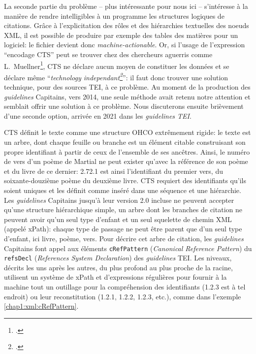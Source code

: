 La seconde partie du problème -- plus intéressante pour nous ici -- s'intéresse à la manière de rendre intelligibles à un programme les structures logiques de citations. Grâce à l'explicitation des rôles et des hiérarchies textuelles des noeuds XML, il est possible de produire par exemple des tables des matières pour un logiciel: le fichier devient donc \textit{machine-actionable}. Or, si l'usage de l'expression \enquote{encodage CTS} peut se trouver chez des chercheurs aguerris comme  L.~Muellner\footcite{muellner2019free}, CTS ne déclare aucun moyen de constituer les données et se déclare même \enquote{\textit{technology independant\footcite{smith_brief_nodate}}}: il faut donc trouver une solution technique, pour des sources TEI, à ce problème. Au moment de la production des \textit{guidelines} Capitains, vers 2014, une seule méthode avait retenu notre attention et semblait offrir une solution à ce problème. Nous discuterons ensuite brièvement d'une seconde option, arrivée en 2021 dans les \textit{guidelines TEI}.

CTS définit le texte comme une structure OHCO extrêmement rigide: le texte est un arbre, dont chaque feuille ou branche est un élément citable construisant son propre identifiant à partir de ceux de l'ensemble de ses ancêtres. Ainsi, le numéro de vers d'un poème de Martial ne peut exister qu'avec la référence de son poème et du livre de ce dernier: 2.72.1 est ainsi l'identifiant du premier vers, du soixante-douzième poème du deuxième livre. CTS requiert des identifiants qu'ils soient uniques et les définit comme inséré dans une séquence et une hiérarchie. Les \textit{guidelines} Capitains jusqu'à leur version 2.0 incluse ne peuvent accepter qu'une structure hiérarchique simple, un arbre dont les branches de citation ne peuvent avoir qu'un seul type d'enfant et un seul squelette de chemin XML (appelé xPath): chaque type de passage ne peut être parent que d'un seul type d'enfant, ici livre, poème, vers. Pour décrire cet arbre de citation, les \textit{guidelines} Capitains font appel aux éléments \texttt{cRefPattern} (\textit{Canonical Reference Pattern}) du \texttt{refsDecl} (\textit{References System Declaration}) des \textit{guidelines} TEI. Les niveaux, décrits les uns après les autres, du plus profond au plus proche de la racine, utilisent un système de xPath et d'expressions régulières pour fournir à la machine tout un outillage pour la compréhension des identifiants (1.2.3 est à tel endroit) ou leur reconstitution (1.2.1, 1.2.2, 1.2.3, etc.), comme dans l'exemple \ref{chap1:xml:cRefPattern}.

